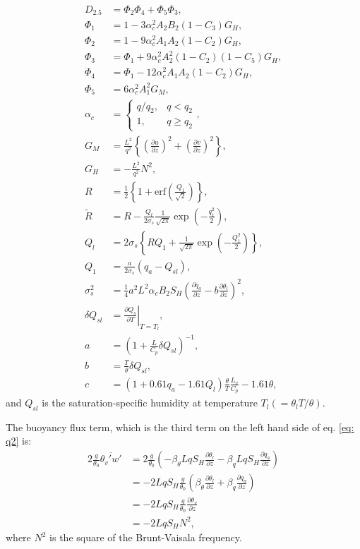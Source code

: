 \begin{align}
  D_{2.5} &= \Phi_2\Phi_4 + \Phi_5\Phi_3, \\
  \Phi_1 &= 1-3\alpha_c^2A_2B_2(1-C_3)G_H, \\
  \Phi_2 &= 1-9\alpha_c^2A_1A_2(1-C_2)G_H, \\
  \Phi_3 &= \Phi_1+9\alpha_c^2A_2^2(1-C_2)(1-C_5)G_H, \\
  \Phi_4 &= \Phi_1-12\alpha_c^2A_1A_2(1-C_2)G_H, \\
  \Phi_5 &= 6\alpha_c^2A_1^2G_M, \\
  \alpha_c &= \left\{
  \begin{array}{ll}
    q/q_2, & q<q_2 \\
    1, & q \ge q_2
  \end{array}
  \right. , \\
  G_M &= \frac{L^2}{q^2}\left\{\left(\frac{\partial u}{\partial z}\right)^2 + \left(\frac{\partial v}{\partial z}\right)^2\right\}, \\
  G_H &= -\frac{L^2}{q^2}N^2, \\
  R &= \frac{1}{2}\left\{1+\mathrm{erf}\left(\frac{Q_1}{\sqrt{2}}\right)\right\}, \\
  \tilde{R} &= R - \frac{Q_l}{2\sigma_s}\frac{1}{\sqrt{2\pi}}\exp\left(-\frac{q_1^2}{2}\right), \\
  Q_l &= 2\sigma_s\left\{RQ_1+\frac{1}{\sqrt{2\pi}}\exp\left(-\frac{Q_1^2}{2}\right)\right\}, \\
  Q_1 &= \frac{a}{2\sigma_s}(q_a-Q_{sl}), \\
  \sigma_s^2 &= \frac{1}{4}a^2L^2\alpha_cB_2S_H\left(\frac{\partial q_a}{\partial z} -b\frac{\partial \theta_l}{\partial z}\right)^2, \\
  \delta Q_{sl} &= \left.\frac{\partial Q_s}{\partial T}\right|_{T=T_l}, \\
  a &= \left(1+\frac{L}{C_p}\delta Q_{sl}\right)^{-1}, \\
  b &= \frac{T}{\theta}\delta Q_{sl}, \\
  c &= (1+0.61q_a - 1.61Q_l)\frac{\theta}{T}\frac{L_v}{C_p} - 1.61\theta,
\end{align}
and $Q_{sl}$ is the saturation-specific humidity at temperature $T_l (=\theta_l T/\theta)$.

The buoyancy flux term, which is the third term on the left hand side of eq. \ref{eq: q2} is:
\begin{align}
  2\frac{g}{\theta_0}\overline{\theta_v' w'}
  &= 2\frac{g}{\theta_0}\left(-\beta_\theta LqS_H\frac{\partial \theta_l}{\partial z} - \beta_q LqS_H\frac{\partial q_a}{\partial z}\right) \nonumber \\
  &= -2LqS_H\frac{g}{\theta_0}\left(\beta_\theta\frac{\partial \theta_l}{\partial z}+\beta_q\frac{\partial q_a}{\partial z}\right) \nonumber \\
  &= -2LqS_H\frac{g}{\theta_0}\frac{\partial \theta_v}{\partial z} \nonumber \\
  &= -2LqS_HN^2,
\end{align}
where $N^2$ is the square of the Brunt-Vaisala frequency.

